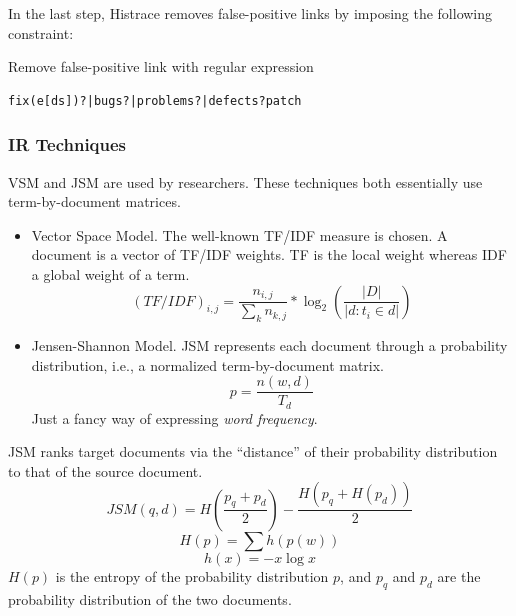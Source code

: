 \documentclass[12pt,hyperref=true,mathserif]{beamer}
\begin{document}
\begin{frame}
  In the last step, Histrace removes false-positive links by imposing
  the following constraint:
  \begin{block}{Remove false-positive link with regular expression}
\begin{verbatim}
fix(e[ds])?|bugs?|problems?|defects?patch
\end{verbatim}
  \end{block}
\end{frame}

\begin{frame}
  \frametitle{IR Techniques}
  VSM and JSM are used by researchers. These techniques both
  essentially use term-by-document matrices. 
  \begin{itemize}
    \item Vector Space Model. The well-known TF/IDF measure is
      chosen. A document is a vector of TF/IDF weights. TF is the
      local weight whereas IDF a global weight of a term.
      \begin{equation}
        \label{eq:1}
        {(TF/IDF)}_{i,j}=\frac{n_{i,j}}{\sum_{k}n_{k,j}}*
        \log_{2}{(\frac{|D|}{|d:t_{i}\in d|})}
      \end{equation}
    \item Jensen-Shannon Model. JSM represents each document through a
      probability distribution, i.e., a normalized term-by-document
      matrix.
      \begin{equation}
        \label{eq:2}
        p=\frac{n(w,d)}{T_{d}}
      \end{equation}
      Just a fancy way of expressing \emph{word frequency}.
      
  \end{itemize}
\end{frame}


\begin{frame}
  JSM ranks target documents via the ``distance'' of their probability
  distribution to that of the source document.
\begin{equation}
        \label{eq:4}
        JSM(q,d)=H(\frac{p_{q}+p_{d}}{2})-\frac{H(p_{q}+H(p_{d}))}{2}
\end{equation}
\begin{equation}
  \label{eq:5}
  H(p)=\sum h(p(w))
\end{equation}
\begin{equation}
  \label{eq:6}
  h(x)=-x\log x
\end{equation}
$H(p)$ is the entropy of the probability distribution $p$, and $p_{q}$
and $p_{d}$ are the probability distribution of the two documents.
\end{frame}
\end{document}
